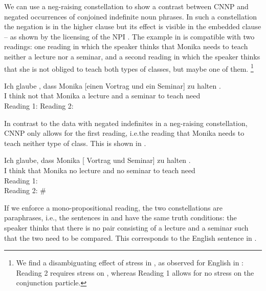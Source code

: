 \documentclass[output=paper]{langsci/langscibook}
\begin{document}
We can use a neg-raising constellation \citep{Horn:78} to show a contrast between CNNP and negated occurrences of conjoined indefinite noun phrases. 
In such a constellation the negation is in the higher clause but its effect is visible in the embedded clause -- as shown by the licensing of the NPI . 
The example in  is compatible with two readings: one reading in which the speaker thinks that Monika needs to teach neither a lecture nor a seminar, and a second reading in which the speaker thinks that she is not obliged to teach both types of classes, but maybe one of them.%
\footnote{We find a disambiguating effect of stress in , as observed for English in \cite[226]{Szabolcsi:Haddican:04}: Reading 2 requires stress on , whereas Reading 1 allows for no stress on the conjunction particle.}

\ea \label{ex-tie-glaub-both}
\gll Ich glaube , dass Monika [einen Vortrag und ein Seminar] zu halten .\\
I think not that Monika \hphantom{[}a lecture and a seminar to teach need\\
\glt Reading 1: 
\glt Reading 2: 
\z 

In contrast to the data with negated indefinites in a neg-raising constellation, CNNP only allows for the first reading, i.e.\@ the reading that Monika needs to teach neither type of class. 
This is shown in .

\ea \label{ex-tie-glaub-neither}
\gll 
Ich glaube, dass Monika [ Vortrag und  Seminar] zu halten .\\
I think that Monika no lecture and no seminar to teach need\\
\glt 
Reading 1: \\
Reading 2: \# 
\z 

If we enforce a mono-propositional reading, the two constellations are paraphrases, i.e., the sentences in  and  have the same truth conditions:  the speaker thinks that there is no pair consisting of a lecture and a seminar such that the two need to be compared. This corresponds to the English sentence in .
\end{document}
